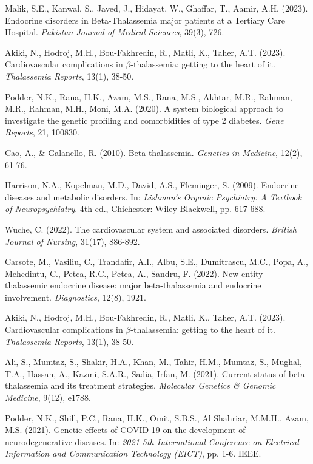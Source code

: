 \documentclass[a4paper,12pt,openbib,oneside]{memoir}
\theoremstyle{plain}
\theoremstyle{plain}
\theoremstyle{plain}
\theoremstyle{definition}
\theoremstyle{plain}
\theoremstyle{plain}
\theoremstyle{plain}
\begin{document}
\begin{thebibliography}{99}

 Malik, S.E., Kanwal, S., Javed, J., Hidayat, W., Ghaffar, T., Aamir, A.H. (2023). Endocrine disorders in Beta-Thalassemia major patients at a Tertiary Care Hospital. \textit{Pakistan Journal of Medical Sciences}, 39(3), 726.

 Akiki, N., Hodroj, M.H., Bou-Fakhredin, R., Matli, K., Taher, A.T. (2023). Cardiovascular complications in $\beta$-thalassemia: getting to the heart of it. \textit{Thalassemia Reports}, 13(1), 38-50.

 Podder, N.K., Rana, H.K., Azam, M.S., Rana, M.S., Akhtar, M.R., Rahman, M.R., Rahman, M.H., Moni, M.A. (2020). A system biological approach to investigate the genetic profiling and comorbidities of type 2 diabetes. \textit{Gene Reports}, 21, 100830.

 Cao, A., \& Galanello, R. (2010). Beta-thalassemia. \textit{Genetics in Medicine}, 12(2), 61-76.

 Harrison, N.A., Kopelman, M.D., David, A.S., Fleminger, S. (2009). Endocrine diseases and metabolic disorders. In: \textit{Lishman's Organic Psychiatry: A Textbook of Neuropsychiatry}. 4th ed., Chichester: Wiley-Blackwell, pp. 617-688.

 Wuche, C. (2022). The cardiovascular system and associated disorders. \textit{British Journal of Nursing}, 31(17), 886-892.

 Carsote, M., Vasiliu, C., Trandafir, A.I., Albu, S.E., Dumitrascu, M.C., Popa, A., Mehedintu, C., Petca, R.C., Petca, A., Sandru, F. (2022). New entity—thalassemic endocrine disease: major beta-thalassemia and endocrine involvement. \textit{Diagnostics}, 12(8), 1921.

 Akiki, N., Hodroj, M.H., Bou-Fakhredin, R., Matli, K., Taher, A.T. (2023). Cardiovascular complications in $\beta$-thalassemia: getting to the heart of it. \textit{Thalassemia Reports}, 13(1), 38-50.

 Ali, S., Mumtaz, S., Shakir, H.A., Khan, M., Tahir, H.M., Mumtaz, S., Mughal, T.A., Hassan, A., Kazmi, S.A.R., Sadia, Irfan, M. (2021). Current status of beta-thalassemia and its treatment strategies. \textit{Molecular Genetics \& Genomic Medicine}, 9(12), e1788.

 Podder, N.K., Shill, P.C., Rana, H.K., Omit, S.B.S., Al Shahriar, M.M.H., Azam, M.S. (2021). Genetic effects of COVID-19 on the development of neurodegenerative diseases. In: \textit{2021 5th International Conference on Electrical Information and Communication Technology (EICT)}, pp. 1-6. IEEE.


\end{thebibliography}
\end{document}
